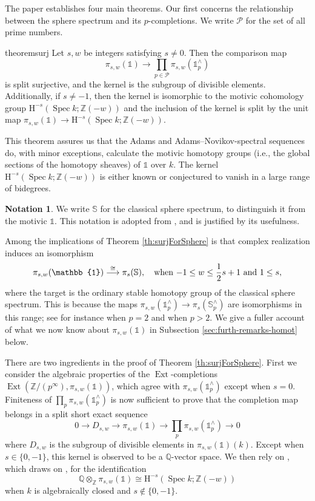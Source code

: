 \documentclass[11pt, oneside, dvipsnames, svgnames, table, final]{amsart}
\newcommand{\mathbx}[1]{\mathbb{#1}}
\theoremstyle{plain}
\theoremstyle{definition}
\newtheorem{notation}[thm]{Notation}
\theoremstyle{remark}
\newcommand{\Q}{\mathbx{Q}}
\newcommand{\Z}{\mathbx{Z}}
\newcommand{\ZZ}{\Z}
\newcommand{\Ext}{\operatorname{Ext}}
\newcommand{\tensor}{\otimes}
\newcommand{\spec}{\operatorname{Spec}}
\newcommand{\Spec}{\spec}
\newcommand{\sh}[1]{\mathcal{#1}}
\newcommand{\Hoh}{\mathrm{H}}
\newcommand{\isom}{\cong}
\newcommand{\iso}{\isom}
\newcommand{\mto}[1]{\stackrel{#1}{\longrightarrow}}
\newcommand{\isomto}{\mto{\isom}}
\newcommand{\<}[1]{{\langle}#1 {\rangle}}
\newcommand{\one}{\mathbb{1}}
\newcommand{\SpS}{\mathbb{S}}
\begin{document}
The paper establishes four main theorems. Our first concerns the relationship between the sphere spectrum and its $p$-completions. We write $\sh P$ for the set of all prime numbers. 

\begin{restatable}{theorem}{surj}\label{th:surjForSphere}
  Let $s,w$ be integers satisfying $s \neq 0$. Then the comparison map
  \[ \pi_{s,w}(\one) \to \prod_{p \in \sh P} \pi_{s,w}(\one^\wedge_p) \]
  is split surjective, and the kernel is the subgroup of divisible elements. Additionally, if $s \neq -1$, then the kernel is isomorphic to the motivic cohomology group $\Hoh^{-s}(\Spec k; \Z(-w))$ and the inclusion of the kernel is split by the unit map $\pi_{s,w}(\one) \to \Hoh^{-s}(\Spec k; \Z(-w))$.
\end{restatable}



This theorem assures us that the Adams and Adams--Novikov-spectral sequences do, with minor exceptions, calculate the motivic homotopy groups (i.e., the global sections of the homotopy sheaves) of $\one$ over $k$. The kernel $\Hoh^{-s}(\Spec k; \ZZ(-w))$ is either known or conjectured to vanish in a large range of bidegrees.

\begin{notation}
  We write $\SpS$ for the classical sphere spectrum, to distinguish it from the motivic $\one$. This notation is adopted from \cite{Rondigs2024}, and is justified by its usefulness.
\end{notation}

Among the implications of Theorem \ref{th:surjForSphere} is that complex realization induces an isomorphism
\begin{equation}
  \label{eq:3}
 \pi_{s,w}(\one) \isomto \pi_s(\SpS), \text{\quad when $-1 \le w \le \frac{1}{2}s+1$ and $1 \le s$},
\end{equation}
where the target is the ordinary stable homotopy group of the classical sphere spectrum. This is because the maps  $\pi_{s,w}(\one^{\wedge}_p) \to \pi_s(\SpS^{\wedge}_p)$ are isomorphisms in this range; see for instance \cite{Gheorghe2017} when $p=2$ and \cite{Stahn2018} when $p>2$.
We give a fuller account of what we now know about $\pi_{s,w}(\one)$ in Subsection \ref{sec:furth-remarks-homot} below.


There are two ingredients in the proof of Theorem \ref{th:surjForSphere}. First we consider the algebraic properties of the $\Ext$-completions $\Ext(\Z/(p^\infty), \pi_{s,w}(\one))$, which agree with $\pi_{s,w}(\one^{\wedge}_p)$ except when $s=0$. Finiteness of $\prod_{p} \pi_{s,w}(\one^\wedge_p)$ is now sufficient to prove that the completion map belongs in a split short exact sequence 
\[ 0 \to D_{s,w} \to \pi_{s,w}(\one) \to \prod_p \pi_{s,w}(\one^{\wedge}_p) \to 0\]
where $D_{s,w}$ is the subgroup of divisible elements in $\pi_{s,w}(\one)(k)$. Except when $s\in \{0,-1\}$, this kernel is observed to be a $\Q$-vector space. We then rely on \cite{Ananyevskiy2017}, which draws on \cite{Cisinski2019}, for the identification 
\[ \Q \tensor_\Z \pi_{s,w}(\one) \iso \Hoh^{-s}(\Spec k; \Z(-w)) \] 
when $k$ is algebraically closed and $s \not \in \{0, -1\}$.
\end{document}
